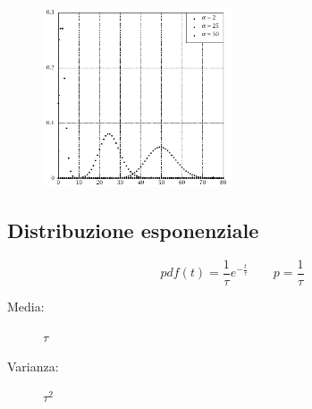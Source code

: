 \documentclass[12pt]{report}
\theoremstyle{remark}
\theoremstyle{theorem}
\begin{document}
\begin{figure}[H]
    \centering
    \includegraphics[width=0.5\textwidth]{immagini/poisson.png}
    \label{fig:poisson}
\end{figure}

\subsection*{Distribuzione esponenziale}
\[pdf(t) = \frac{1}{\tau}e^{-\frac{t}{\tau}}\qquad p=\frac{1}{\tau}\]
\begin{description}
	\item[Media:] $\tau$
 \item[Varianza:] $\tau^2$  
\end{description}
\end{document}
